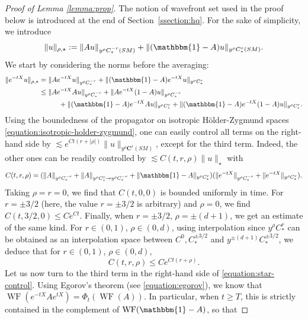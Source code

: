 \documentclass[JEP,XML,SOM,Unicode,NoFloatCountersInSection]{cedram}
\newcommand{\bC}{\boldsymbol{C}}
\DeclareMathOperator{\WF}{WF}
\theoremstyle{plain}
\theoremstyle{definition}
\begin{document}
\begin{proof}[Proof of Lemma \ref{lemma:prop}]
The notion of wavefront set used in the proof below is introduced at the end of Section~\ref{ssection:hq}. For the sake of simplicity, we introduce
\begin{equation}
\label{equation:aniso1bis}
\|u\|_{\rho, \star} := \|Au\|_{y^\rho C^{-r}_*(SM)} + \|(\mathbbm{1}-A)u\|_{y^\rho C^r_*(SM)}.
\end{equation}
We start by considering the norms before the averaging:
\begin{equation}
\label{equation:star-control}
\begin{split}
\| e^{-tX}u\|_{\rho,\star} &= \|A e^{-tX}u\|_{y^\rho C^{-r}_*} + \|(\mathbbm{1}-A) e^{-tX}u \|_{y^\rho C^{r}_*} \\
& \leq \|A e^{-tX}Au\|_{y^\rho C^{-r}_*} + \|A e^{-tX}(1-A)u \|_{y^\rho C^{-r}_*}\\
& \hspace*{1cm}+ \|(\mathbbm{1}-A)e^{-tX}A u\|_{y^\rho C^r_*} + \|(\mathbbm{1}-A)e^{-tX}(1-A)u\|_{y^\rho C^r_*}.
\end{split}
\end{equation}
Using the boundedness of the propagator on isotropic Hölder-Zygmund spaces \eqref{equation:isotropic-holder-zygmund}, one can easily control all terms on the right-hand side by $\lesssim e^{C t (r+ |\rho|)} \|u\|_{y^\rho \bC^r(SM)}$, except for the third term. Indeed, the other ones can be readily controlled by \hbox{$\lesssim C(t,r,\rho)\|u\|_\star$} with
\[
C(t,r,\rho)= ( \|A\|_{y^\rho C^{-r}_*} + \|A\|_{y^\rho C^r_*\to y^\rho C^{-r}_*} + \|\mathbbm{1}-A\|_{y^\rho C^r_*}) ( \| e^{-tX} \|_{y^\rho C^{-r}_*} + \| e^{-tX}\|_{y^\rho C^r_*}).
\]
Taking $\rho = r = 0$, we find that $C(t,0,0)$ is bounded uniformly in time. For $r=\pm 3/2$ (here, the value $r=\pm 3/2$ is arbitrary) and $\rho=0$, we find $C(t,3/2,0) \leq C e^{C t}$. Finally, when $r=\pm 3/2$, $\rho = \pm (d+1)$, we get an estimate of the same kind. For $r \in (0,1)$, $\rho \in (0,d)$, using interpolation since $y^\rho C^r_*$ can be obtained as an interpolation space between $C^0, C^{\pm 3/2}_*$ and $y^{\pm (d+1)} C^{\pm 3/2}_*$, we deduce that for $r\in (0,1)$, $\rho \in (0,d)$,
\begin{equation}\label{eq:exponential-in-time}
C(t,r,\rho) \leq C e^{C t( r+ \rho)}.
\end{equation}
Let us now turn to the third term in the right-hand side of \eqref{equation:star-control}. Using Egorov's theorem (see \eqref{equation:egorov}), we know that $\WF( e^{-tX}Ae^{tX}) = \Phi_{t}(\WF(A))$. In particular, when $t\geq T$, this is strictly contained in the complement of $\WF(\mathbbm{1}-A)$, so that

\end{proof}
\end{document}
